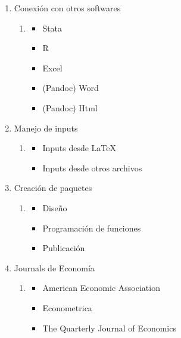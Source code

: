\documentclass[12pt]{article}
\begin{document}
\begin{enumerate}[label={\bfseries\arabic*.}]
\begin{enumerate}[start=1,label={\large\bfseries Módulo\ \arabic*:},leftmargin=2cm]
    \item Conexión con otros softwares
    \begin{enumerate}[start=10,label={\bfseries Semana\ \arabic*:},leftmargin=1cm,rightmargin=.1\linewidth]
        \item
        \begin{itemize}
            \item Stata 
            \item R
            \item Excel
            \item (Pandoc) Word
            \item (Pandoc) Html
        \end{itemize}
    \end{enumerate}
    \item Manejo de inputs 
    \begin{enumerate}[start=11,label={\bfseries Semana\ \arabic*:},leftmargin=1cm,rightmargin=.1\linewidth]
        \item
        \begin{itemize}
            \item Inputs desde \LaTeX
            \item Inputs desde otros archivos
        \end{itemize}
    \end{enumerate}
    \item Creación de paquetes
    \begin{enumerate}[start=12,label={\bfseries Semana\ \arabic*:},leftmargin=1cm,rightmargin=.1\linewidth]
        \item
        \begin{itemize}
            \item Diseño
            \item Programación de funciones
            \item Publicación
        \end{itemize}
    \end{enumerate}
    \item Journals de Economía
    \begin{enumerate}[start=13,label={\bfseries Semana\ \arabic*:},leftmargin=1cm,rightmargin=.1\linewidth]
        \item
        \begin{itemize}
            \item American Economic Association
            \item Econometrica
            \item The Quarterly Journal of Economics

\end{itemize}
\end{enumerate}
\end{enumerate}
\end{enumerate}
\end{document}
